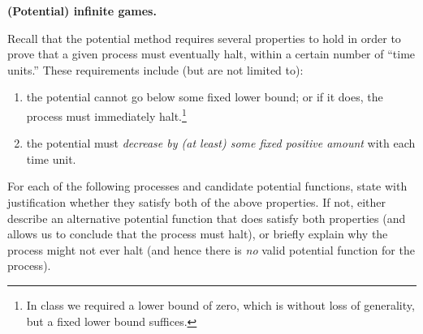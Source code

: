 \documentclass[11pt,addpoints,answers]{exam}
\begin{document}
\begin{questions}
  \begin{solution}
  
        
  \end{solution}


  \question \textbf{(Potential) infinite games.} \label{potential-infinite-games}

  Recall that the potential method requires several properties to hold in order to prove that a given process must eventually halt, within a certain number of ``time units.''
  These requirements include (but are not limited to):
  \begin{enumerate}[itemsep=0pt]
  \item the potential cannot go below some fixed lower bound; or if it does, the process must immediately halt.\footnote{In class we required a lower bound of zero, which is without loss of generality, but a fixed lower bound suffices.}\label{lower-bound}
  
  \item the potential must \emph{decrease by (at least) some fixed positive amount} with each time unit.\label{decrease}
  \end{enumerate}

  For each of the following processes and candidate potential functions, state with justification whether they satisfy both of the above properties.
  If not, either describe an alternative potential function that does satisfy both properties (and allows us to conclude that the process must halt), or briefly explain why the process might not ever halt (and hence there is \emph{no} valid potential function for the process).

\end{questions}
\end{document}
